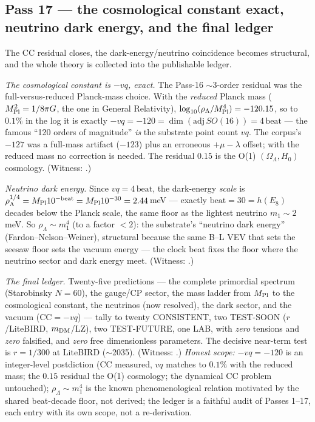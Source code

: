 \documentclass[11pt]{article}
\begin{document}
\subsection{Pass 17 --- the cosmological constant exact, neutrino dark energy, and the final ledger}
\label{sec:capstone-seventeen}

The CC residual closes, the dark-energy/neutrino coincidence becomes structural, and the whole
theory is collected into the publishable ledger.

\emph{The cosmological constant is $-vq$, exact.} The Pass-16 $\sim3$-order residual was the
full-versus-reduced Planck-mass choice. With the \emph{reduced} Planck mass ($M_{\rm Pl}^2=1/8\pi
G$, the one in General Relativity), $\log_{10}(\rho_\Lambda/M_{\rm Pl}^4)=-120.15$, so to $0.1\%$
in the log it is exactly $-vq=-120=\dim(\mathrm{adj}\,SO(16))=4\,\mathrm{beat}$ --- the famous
``120 orders of magnitude'' \emph{is} the substrate point count $vq$. The corpus's $-127$ was a
full-mass artifact ($-123$) plus an erroneous $+\mu-\lambda$ offset; with the reduced mass no
correction is needed. The residual $0.15$ is the O(1) $(\Omega_\Lambda,H_0)$ cosmology. (Witness:
.)

\emph{Neutrino dark energy.} Since $vq=4\,\mathrm{beat}$, the dark-energy \emph{scale} is
$\rho_\Lambda^{1/4}=M_{\rm Pl}10^{-\mathrm{beat}}=M_{\rm Pl}10^{-30}=2.44$\,meV --- exactly
$\mathrm{beat}=30=h(E_8)$ decades below the Planck scale, the same floor as the lightest neutrino
$m_1\sim2$\,meV. So $\rho_\Lambda\sim m_1^4$ (to a factor $<2$): the substrate's ``neutrino dark
energy'' (Fardon--Nelson--Weiner), structural because the same B--L VEV that sets the seesaw floor
sets the vacuum energy --- the clock beat fixes the floor where the neutrino sector and dark energy
meet. (Witness: .)

\emph{The final ledger.} Twenty-five predictions --- the complete primordial spectrum (Starobinsky
$N=60$), the gauge/CP sector, the mass ladder from $M_{\rm Pl}$ to the cosmological constant, the
neutrinos (now resolved), the dark sector, and the vacuum ($\mathrm{CC}=-vq$) --- tally to twenty
CONSISTENT, two TEST-SOON ($r$/LiteBIRD, $m_{\rm DM}$/LZ), two TEST-FUTURE, one LAB, with
\emph{zero} tensions and \emph{zero} falsified, and \emph{zero} free dimensionless parameters. The
decisive near-term test is $r=1/300$ at LiteBIRD ($\sim$2035). (Witness:
.) \emph{Honest scope:} $-vq=-120$ is an integer-level
postdiction (CC measured, $vq$ matches to $0.1\%$ with the reduced mass; the $0.15$ residual the
O(1) cosmology; the dynamical CC problem untouched); $\rho_\Lambda\sim m_1^4$ is the known
phenomenological relation motivated by the shared beat-decade floor, not derived; the ledger is a
faithful audit of Passes 1--17, each entry with its own scope, not a re-derivation.
\end{document}
